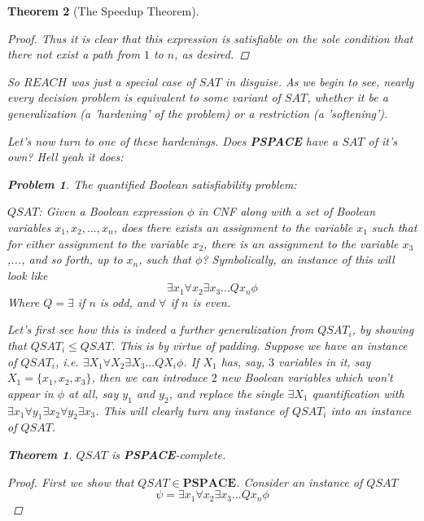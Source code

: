 \documentclass{article}
\theoremstyle{definition}
\newtheorem{problem}{Problem}
\theoremstyle{plain}
\theoremstyle{theorem}
\newtheorem{theorem}{Theorem}[section]
\begin{document}
\begin{theorem}[The Speedup Theorem]
\begin{proof}
    Thus it is clear that this expression is satisfiable on the sole condition that there not exist a path from $1$ to $n$, as desired.
\end{proof}
So $REACH$ was just a special case of $SAT$ in disguise. As we begin to see, nearly every decision problem is equivalent to some variant of $SAT$, whether it be a generalization (a 'hardening' of the problem) or a restriction (a 'softening').
\par Let's now turn to one of these hardenings. Does \textbf{PSPACE} have a $SAT$ of it's own? Hell yeah it does:
\begin{problem} The \textit{quantified} Boolean satisfiability problem:
    \begin{center}
        $QSAT$: Given a Boolean expression $\phi$ in CNF along with a set of Boolean variables $x_1,x_2,...,x_n$, does there exists an assignment to the variable $x_1$ such that for either assignment to the variable $x_2$, there is an assignment to the variable $x_3$,..., and so forth, up to $x_n$, such that $\phi$? Symbolically, an instance of this will look like
        \[ \exists x_1 \forall x_2 \exists x_3 ... Q x_n \phi \]
        Where $Q = \exists$ if $n$ is odd, and $\forall$ if $n$ is even.
    \end{center}
\end{problem}
Let's first see how this is indeed a further generalization from $QSAT_i$, by showing that $QSAT_i \leq QSAT$. This is by virtue of padding. Suppose we have an instance of $QSAT_i$, i.e. $\exists X_1 \forall X_2 \exists X_3... QX_i \phi$. If $X_1$ has, say, $3$ variables in it, say $X_1 = \{x_1,x_2,x_3\}$, then we can introduce $2$ new Boolean variables which won't appear in $\phi$ at all, say $y_1$ and $y_2$, and replace the single $\exists X_1$ quantification with $\exists x_1 \forall y_1 \exists x_2 \forall y_2 \exists x_3$. This will clearly turn any instance of $QSAT_i$ into an instance of $QSAT$.
\begin{theorem}
    $QSAT$ is \textbf{PSPACE}-complete.
\end{theorem}
\begin{proof}
    First we show that $QSAT \in \textbf{PSPACE}$. Consider an instance of $QSAT$ 
    \[\psi = \exists x_1 \forall x_2 \exists x_3 ... Q x_n \phi \]

\end{proof}
\end{theorem}
\end{document}
